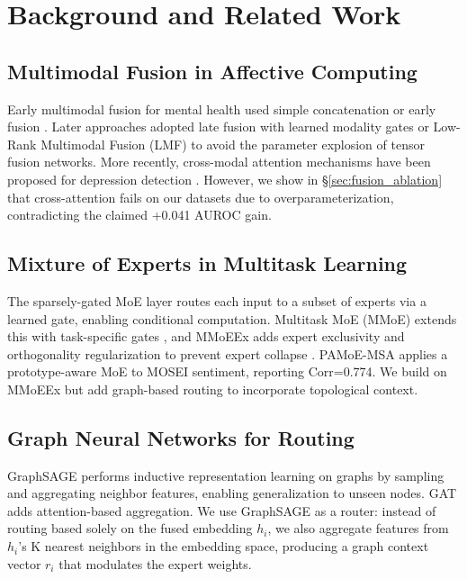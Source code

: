 \documentclass[12pt,oneside]{book}
\begin{document}
\section{Background and Related Work}

\subsection{Multimodal Fusion in Affective Computing}

Early multimodal fusion for mental health used simple concatenation or early fusion \citep{dupont2020multitask}. Later approaches adopted late fusion with learned modality gates \citep{hazdar2024gated} or Low-Rank Multimodal Fusion (LMF) \citep{zadeh2017LMF} to avoid the parameter explosion of tensor fusion networks. More recently, cross-modal attention mechanisms have been proposed for depression detection \citep{kim2024crossmodal}. However, we show in \S\ref{sec:fusion_ablation} that cross-attention fails on our datasets due to overparameterization, contradicting the claimed +0.041 AUROC gain.

\subsection{Mixture of Experts in Multitask Learning}

The sparsely-gated MoE layer \citep{shazeer2017moe} routes each input to a subset of experts via a learned gate, enabling conditional computation. Multitask MoE (MMoE) extends this with task-specific gates \citep{ma2018model}, and MMoEEx adds expert exclusivity and orthogonality regularization to prevent expert collapse \citep{jacobs2024mmoe}. PAMoE-MSA \citep{pamoe2025msa} applies a prototype-aware MoE to MOSEI sentiment, reporting Corr=0.774. We build on MMoEEx but add graph-based routing to incorporate topological context.

\subsection{Graph Neural Networks for Routing}

GraphSAGE \citep{graphsage2017inductive} performs inductive representation learning on graphs by sampling and aggregating neighbor features, enabling generalization to unseen nodes. GAT \citep{gat2018attention} adds attention-based aggregation. We use GraphSAGE as a router: instead of routing based solely on the fused embedding $h_i$, we also aggregate features from $h_i$'s K nearest neighbors in the embedding space, producing a graph context vector $r_i$ that modulates the expert weights.
\end{document}
